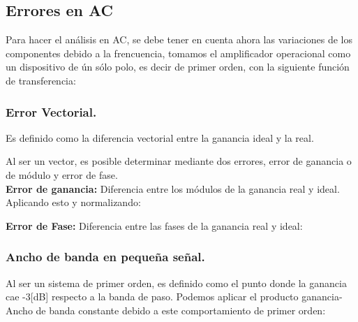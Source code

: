 \subsection{Errores en AC}
    Para hacer el análisis en AC, se debe tener en cuenta ahora las variaciones de los componentes debido a la frencuencia, tomamos el amplificador operacional como un dispositivo de ún sólo polo, es decir de primer orden, con la siguiente función de transferencia:\\

    \begin{center}
    \end{center}
    
\subsubsection{Error Vectorial.}
    Es definido como la diferencia vectorial entre la ganancia ideal y la real.
    \begin{center}
    \end{center}

    Al ser un vector, es posible determinar mediante dos errores, error de ganancia o de módulo y error de fase.\\

    \textbf{Error de ganancia:} Diferencia entre los módulos de la ganancia real y ideal. Aplicando esto y normalizando:\\

    \begin{center}
    \end{center}

    \begin{center}
    \end{center}

    \textbf{Error de Fase:} Diferencia entre las fases de la ganancia real y ideal:\\

    \begin{center}
    \end{center}
    
\subsubsection{Ancho de banda en pequeña señal.}
    Al ser un sistema de primer orden, es definido como el punto donde la ganancia cae -3[dB] respecto a la banda de paso. Podemos aplicar el producto ganancia-Ancho de banda constante debido a este comportamiento de primer orden:\\

